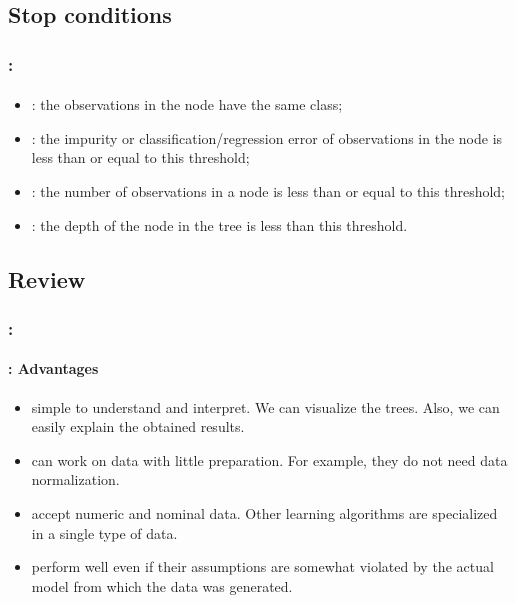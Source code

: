 \documentclass[xcolor=table]{beamer}
\begin{document}
\subsection{Stop conditions}

\begin{frame}
	\frametitle{\insertshortsubtitle: \insertsection}
	\framesubtitle{\insertsubsection}
	
	\begin{itemize}
		\item {}: the observations in the node have the same class;
		\item {}: the impurity or classification/regression error of observations in the node is less than or equal to this threshold;
		\item {}: the number of observations in a node is less than or equal to this threshold;
		\item {}: the depth of the node in the tree is less than this threshold.
	\end{itemize}
	
\end{frame}

\subsection{Review}

\begin{frame}
	\frametitle{\insertshortsubtitle: \insertsection}
	\framesubtitle{\insertsubsection: Advantages}
	
	\begin{itemize}
		\item simple to understand and interpret. We can visualize the trees. Also, we can easily explain the obtained results.
		\item can work on data with little preparation. For example, they do not need data normalization.
		\item accept numeric and nominal data. Other learning algorithms are specialized in a single type of data.
		\item perform well even if their assumptions are somewhat violated by the actual model from which the data was generated.
	\end{itemize}
	
\end{frame}
\end{document}
